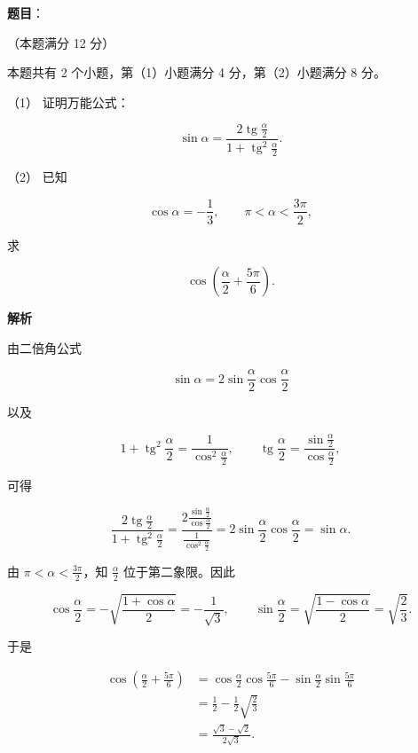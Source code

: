 \begin{answer}

\textbf{题目}：

（本题满分 12 分）

本题共有 2 个小题，第（1）小题满分 4 分，第（2）小题满分 8 分。

（1） 证明万能公式：

\nopagebreak[4]
\[
\sin\alpha=\frac{2\operatorname{tg}\frac\alpha2}
{1+\operatorname{tg}^2\frac\alpha2}.
\]

（2） 已知

\nopagebreak[4]
\[
\cos\alpha=-\frac13,\qquad
\pi<\alpha<\frac{3\pi}{2},
\]

求

\nopagebreak[4]
\[
\cos\left(\frac\alpha2+\frac{5\pi}{6}\right).
\]

\textbf{解析}


由二倍角公式

\nopagebreak[4]
\[
\sin\alpha=2\sin\frac\alpha2\cos\frac\alpha2
\]

以及

\nopagebreak[4]
\[
1+\operatorname{tg}^2\frac\alpha2
=\frac1{\cos^2\frac\alpha2},
\qquad
\operatorname{tg}\frac\alpha2
=\frac{\sin\frac\alpha2}{\cos\frac\alpha2},
\]

可得

\nopagebreak[4]
\[
\frac{2\operatorname{tg}\frac\alpha2}
{1+\operatorname{tg}^2\frac\alpha2}
=\frac{2\frac{\sin\frac\alpha2}{\cos\frac\alpha2}}
{\frac1{\cos^2\frac\alpha2}}
=2\sin\frac\alpha2\cos\frac\alpha2
=\sin\alpha.
\]


由 $\pi<\alpha<\frac{3\pi}{2}$，知 $\frac\alpha2$ 位于第二象限。因此

\nopagebreak[4]
\[
\cos\frac\alpha2=-\sqrt{\frac{1+\cos\alpha}{2}}
=-\frac1{\sqrt3},
\qquad
\sin\frac\alpha2=\sqrt{\frac{1-\cos\alpha}{2}}
=\sqrt{\frac23}.
\]

于是

\nopagebreak[4]
\[
\begin{aligned}
\cos\left(\frac\alpha2+\frac{5\pi}{6}\right)
&=\cos\frac\alpha2\cos\frac{5\pi}{6}
-\sin\frac\alpha2\sin\frac{5\pi}{6}\\
&=\frac12-\frac12\sqrt{\frac23}\\
&=\frac{\sqrt3-\sqrt2}{2\sqrt3}.
\end{aligned}
\]



\end{answer}
